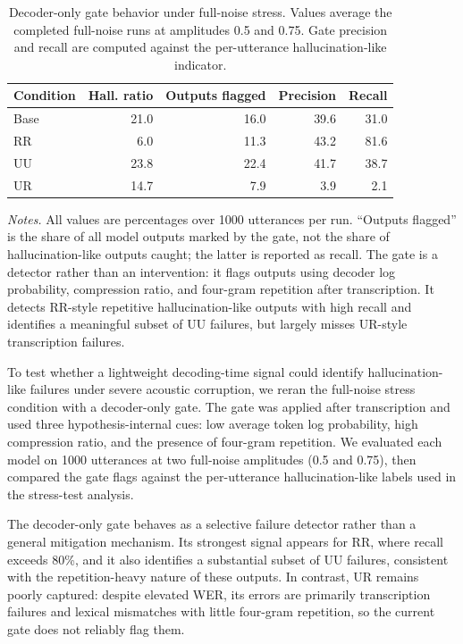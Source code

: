 \begin{table}[t]
\centering
\caption{Decoder-only gate behavior under full-noise stress. Values average the completed full-noise runs at amplitudes 0.5 and 0.75. Gate precision and recall are computed against the per-utterance hallucination-like indicator.}
\label{tab:gated_full_noise_detector}
\small
\setlength{\tabcolsep}{5pt}
\begin{tabular}{lrrrr}
\toprule
\textbf{Condition} & \textbf{Hall. ratio} & \textbf{Outputs flagged} & \textbf{Precision} & \textbf{Recall} \\
\midrule
Base & 21.0 & 16.0 & 39.6 & 31.0 \\
RR   & 6.0  & 11.3 & 43.2 & 81.6 \\
UU   & 23.8 & 22.4 & 41.7 & 38.7 \\
UR   & 14.7 & 7.9  & 3.9  & 2.1 \\
\bottomrule
\end{tabular}
\vspace{0.5em}
\begin{minipage}{0.95\linewidth}
\footnotesize
\textit{Notes.} All values are percentages over 1000 utterances per run. ``Outputs flagged'' is the share of all model outputs marked by the gate, not the share of hallucination-like outputs caught; the latter is reported as recall. The gate is a detector rather than an intervention: it flags outputs using decoder log probability, compression ratio, and four-gram repetition after transcription. It detects RR-style repetitive hallucination-like outputs with high recall and identifies a meaningful subset of UU failures, but largely misses UR-style transcription failures.
\end{minipage}
\end{table}

To test whether a lightweight decoding-time signal could identify hallucination-like failures under severe acoustic corruption, we reran the full-noise stress condition with a decoder-only gate. The gate was applied after transcription and used three hypothesis-internal cues: low average token log probability, high compression ratio, and the presence of four-gram repetition. We evaluated each model on 1000 utterances at two full-noise amplitudes (0.5 and 0.75), then compared the gate flags against the per-utterance hallucination-like labels used in the stress-test analysis.

The decoder-only gate behaves as a selective failure detector rather than a general mitigation mechanism. Its strongest signal appears for RR, where recall exceeds 80\%, and it also identifies a substantial subset of UU failures, consistent with the repetition-heavy nature of these outputs. In contrast, UR remains poorly captured: despite elevated WER, its errors are primarily transcription failures and lexical mismatches with little four-gram repetition, so the current gate does not reliably flag them.